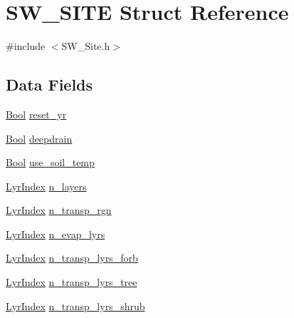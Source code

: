 \hypertarget{struct_s_w___s_i_t_e}{}\section{S\+W\+\_\+\+S\+I\+TE Struct Reference}
\label{struct_s_w___s_i_t_e}


{\ttfamily \#include $<$S\+W\+\_\+\+Site.\+h$>$}

\subsection*{Data Fields}
\begin{DoxyCompactItemize}
\item 
\hyperlink{generic_8h_a39db6982619d623273fad8a383489309}{Bool} \hyperlink{struct_s_w___s_i_t_e_a765f882f259cb7b35e7add0c619487b5}{reset\+\_\+yr}
\item 
\hyperlink{generic_8h_a39db6982619d623273fad8a383489309}{Bool} \hyperlink{struct_s_w___s_i_t_e_aae633b81c30d64e202471683f49efb22}{deepdrain}
\item 
\hyperlink{generic_8h_a39db6982619d623273fad8a383489309}{Bool} \hyperlink{struct_s_w___s_i_t_e_ac833a8e8b0064ae71f4c9e5afbac3e2a}{use\+\_\+soil\+\_\+temp}
\item 
\hyperlink{_s_w___site_8h_a6fece0d49f08459808b94a38696a4180}{Lyr\+Index} \hyperlink{struct_s_w___s_i_t_e_a25d5e9b4d6a783d750815ed70335c7dc}{n\+\_\+layers}
\item 
\hyperlink{_s_w___site_8h_a6fece0d49f08459808b94a38696a4180}{Lyr\+Index} \hyperlink{struct_s_w___s_i_t_e_ac86e8be44e9ab1d2dcf446a6a3d2e49b}{n\+\_\+transp\+\_\+rgn}
\item 
\hyperlink{_s_w___site_8h_a6fece0d49f08459808b94a38696a4180}{Lyr\+Index} \hyperlink{struct_s_w___s_i_t_e_ac352e7034b6e5c5338506ed915dde58a}{n\+\_\+evap\+\_\+lyrs}
\item 
\hyperlink{_s_w___site_8h_a6fece0d49f08459808b94a38696a4180}{Lyr\+Index} \hyperlink{struct_s_w___s_i_t_e_aa8e2f435288f072fd2b54b671ef18b32}{n\+\_\+transp\+\_\+lyrs\+\_\+forb}
\item 
\hyperlink{_s_w___site_8h_a6fece0d49f08459808b94a38696a4180}{Lyr\+Index} \hyperlink{struct_s_w___s_i_t_e_aa50dc8a846261f34cbf9e1872708b617}{n\+\_\+transp\+\_\+lyrs\+\_\+tree}
\item 
\hyperlink{_s_w___site_8h_a6fece0d49f08459808b94a38696a4180}{Lyr\+Index} \hyperlink{struct_s_w___s_i_t_e_ad04993303b563bc613ebf91d49d0b907}{n\+\_\+transp\+\_\+lyrs\+\_\+shrub}
\item 

\end{DoxyCompactItemize}
